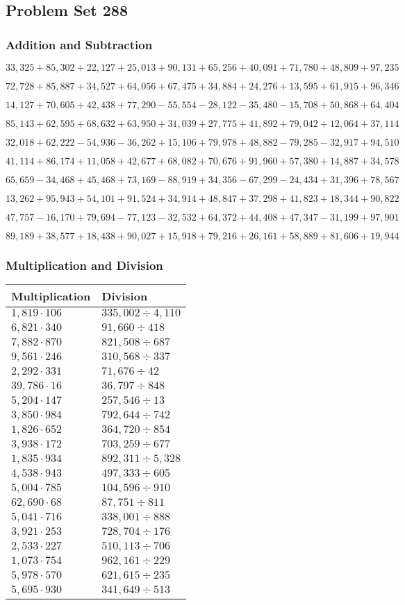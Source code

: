 \hypertarget{problem-set-288}{%
\subsection{Problem Set 288}\label{problem-set-288}}

\hypertarget{addition-and-subtraction}{%
\subsubsection{Addition and
Subtraction}\label{addition-and-subtraction}}

\(33,325+85,302+22,127+25,013+90,131+65,256+40,091+71,780+48,809+97,235\)

\(72,728+85,887+34,527+64,056+67,475+34,884+24,276+13,595+61,915+96,346\)

\(14,127+70,605+42,438+77,290-55,554-28,122-35,480-15,708+50,868+64,404\)

\(85,143+62,595+68,632+63,950+31,039+27,775+41,892+79,042+12,064+37,114\)

\(32,018+62,222-54,936-36,262+15,106+79,978+48,882-79,285-32,917+94,510\)

\(41,114+86,174+11,058+42,677+68,082+70,676+91,960+57,380+14,887+34,578\)

\(65,659-34,468+45,468+73,169-88,919+34,356-67,299-24,434+31,396+78,567\)

\(13,262+95,943+54,101+91,524+34,914+48,847+37,298+41,823+18,344+90,822\)

\(47,757-16,170+79,694-77,123-32,532+64,372+44,408+47,347-31,199+97,901\)

\(89,189+38,577+18,438+90,027+15,918+79,216+26,161+58,889+81,606+19,944\)

\hypertarget{multiplication-and-division}{%
\subsubsection{Multiplication and
Division}\label{multiplication-and-division}}

\begin{longtable}[]{@{}ll@{}}
\toprule
Multiplication & Division\tabularnewline
\midrule
\endhead
\(1,819\cdot106\) & \(335,002÷4,110\)\tabularnewline
\(6,821\cdot340\) & \(91,660÷418\)\tabularnewline
\(7,882\cdot870\) & \(821,508÷687\)\tabularnewline
\(9,561\cdot246\) & \(310,568÷337\)\tabularnewline
\(2,292\cdot331\) & \(71,676÷42\)\tabularnewline
\(39,786\cdot16\) & \(36,797÷848\)\tabularnewline
\(5,204\cdot147\) & \(257,546÷13\)\tabularnewline
\(3,850\cdot984\) & \(792,644÷742\)\tabularnewline
\(1,826\cdot652\) & \(364,720÷854\)\tabularnewline
\(3,938\cdot172\) & \(703,259÷677\)\tabularnewline
\(1,835\cdot934\) & \(892,311÷5,328\)\tabularnewline
\(4,538\cdot943\) & \(497,333÷605\)\tabularnewline
\(5,004\cdot785\) & \(104,596÷910\)\tabularnewline
\(62,690\cdot68\) & \(87,751÷811\)\tabularnewline
\(5,041\cdot716\) & \(338,001÷888\)\tabularnewline
\(3,921\cdot253\) & \(728,704÷176\)\tabularnewline
\(2,533\cdot227\) & \(510,113÷706\)\tabularnewline
\(1,073\cdot754\) & \(962,161÷229\)\tabularnewline
\(5,978\cdot570\) & \(621,615÷235\)\tabularnewline
\(5,695\cdot930\) & \(341,649÷513\)\tabularnewline
\bottomrule
\end{longtable}
